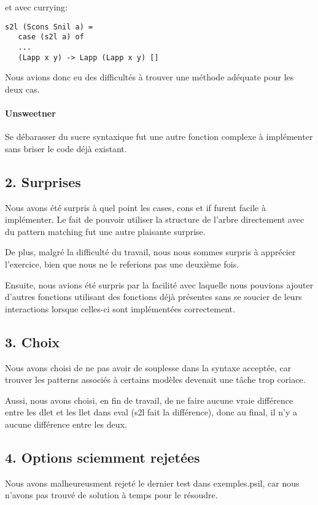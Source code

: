 et avec currying:

\begin{verbatim}
s2l (Scons Snil a) =
   case (s2l a) of
   ...
   (Lapp x y) -> Lapp (Lapp x y) []
\end{verbatim}

Nous avions donc eu des difficultés à trouver une méthode adéquate pour
les deux cas.

\paragraph{Unsweetner}\label{unsweetner}

Se débarasser du sucre syntaxique fut une autre fonction complexe à
implémenter sans briser le code déjà existant.

\subsection{2. Surprises}\label{surprises}

Nous avons été surpris à quel point les cases, cons et if furent facile
à implémenter. Le fait de pouvoir utiliser la structure de l'arbre
directement avec du pattern matching fut une autre plaisante surprise.

De plus, malgré la difficulté du travail, nous nous sommes surpris à
apprécier l'exercice, bien que nous ne le referions pas une deuxième
fois.

Ensuite, nous avions été surpris par la facilité avec laquelle nous
pouvions ajouter d'autres fonctions utilisant des fonctions déjà
présentes sans se soucier de leurs interactions lorsque celles-ci sont
implémentées correctement.

\subsection{3. Choix}\label{choix}

Nous avons choisi de ne pas avoir de souplesse dans la syntaxe acceptée,
car trouver les patterns associés à certains modèles devenait une tâche
trop coriace.

Aussi, nous avons choisi, en fin de travail, de ne faire aucune vraie
différence entre les dlet et les llet dans eval (s2l fait la
différence), donc au final, il n'y a aucune différence entre les deux.

\subsection{4. Options sciemment
rejetées}\label{options-sciemment-rejetees}

Nous avons malheureusment rejeté le dernier test dans exemples.psil, car
nous n'avons pas trouvé de solution à temps pour le résoudre.
